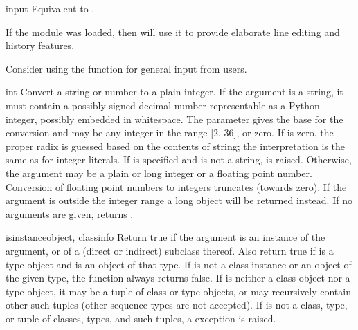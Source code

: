 \begin{funcdesc}{input}{}
  Equivalent to .

  If the  module was loaded, then
   will use it to provide elaborate line editing and
  history features.

  Consider using the  function for general input
  from users.
\end{funcdesc}

\begin{funcdesc}{int}{}
  Convert a string or number to a plain integer.  If the argument is a
  string, it must contain a possibly signed decimal number
  representable as a Python integer, possibly embedded in whitespace.
  The  parameter gives the base for the
  conversion and may be any integer in the range [2, 36], or zero.  If
   is zero, the proper radix is guessed based on the
  contents of string; the interpretation is the same as for integer
  literals.  If  is specified and  is not a string,
   is raised.
  Otherwise, the argument may be a plain or
  long integer or a floating point number.  Conversion of floating
  point numbers to integers truncates (towards zero).
  If the argument is outside the integer range a long object will
  be returned instead.  If no arguments are given, returns .
\end{funcdesc}

\begin{funcdesc}{isinstance}{object, classinfo}
  Return true if the  argument is an instance of the
   argument, or of a (direct or indirect) subclass
  thereof.  Also return true if  is a type object and
   is an object of that type.  If  is not a
  class instance or an object of the given type, the function always
  returns false.  If  is neither a class object nor a
  type object, it may be a tuple of class or type objects, or may
  recursively contain other such tuples (other sequence types are not
  accepted).  If  is not a class, type, or tuple of
  classes, types, and such tuples, a  exception
  is raised.
\end{funcdesc}

